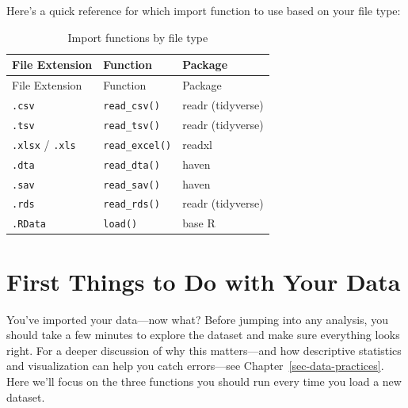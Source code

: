 \documentclass[
  letterpaper,
  DIV=11,
  numbers=noendperiod]{scrreprt}
\begin{document}
\begin{tcolorbox}[enhanced jigsaw, arc=.35mm, bottomrule=.15mm, bottomtitle=1mm, breakable, colback=white, colbacktitle=quarto-callout-tip-color!10!white, colframe=quarto-callout-tip-color-frame, coltitle=black, left=2mm, leftrule=.75mm, opacityback=0, opacitybacktitle=0.6, rightrule=.15mm, title=\textcolor{quarto-callout-tip-color}{\faLightbulb}\hspace{0.5em}{Which Function Do I Use?}, titlerule=0mm, toprule=.15mm, toptitle=1mm]

Here's a quick reference for which import function to use based on your
file type:

\begin{longtable}[]{@{}lll@{}}
\caption{Import functions by file
type}\label{tbl-import-functions}\tabularnewline
\toprule\noalign{}
File Extension & Function & Package \\
\midrule\noalign{}
\endfirsthead
\toprule\noalign{}
File Extension & Function & Package \\
\midrule\noalign{}
\endhead
\bottomrule\noalign{}
\endlastfoot
\texttt{.csv} & \texttt{read\_csv()} & readr (tidyverse) \\
\texttt{.tsv} & \texttt{read\_tsv()} & readr (tidyverse) \\
\texttt{.xlsx} / \texttt{.xls} & \texttt{read\_excel()} & readxl \\
\texttt{.dta} & \texttt{read\_dta()} & haven \\
\texttt{.sav} & \texttt{read\_sav()} & haven \\
\texttt{.rds} & \texttt{read\_rds()} & readr (tidyverse) \\
\texttt{.RData} & \texttt{load()} & base R \\
\end{longtable}

\end{tcolorbox}

\section{First Things to Do with Your
Data}\label{first-things-to-do-with-your-data}

You've imported your data---now what? Before jumping into any analysis,
you should take a few minutes to explore the dataset and make sure
everything looks right. For a deeper discussion of why this
matters---and how descriptive statistics and visualization can help you
catch errors---see Chapter~\ref{sec-data-practices}. Here we'll focus on
the three functions you should run every time you load a new dataset.
\end{document}

